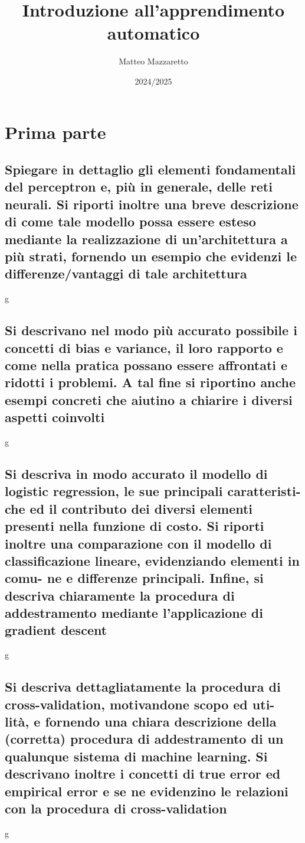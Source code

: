 \documentclass[10pt,oneside,a4paper]{article}
\title{Introduzione all'apprendimento automatico}
\author{Matteo Mazzaretto}
\date{2024/2025}
\begin{document}
\maketitle
\begin{center}
\renewcommand{\contentsname}{Indice}
\tableofcontents
\end{center}
\newpage
\setcounter{page}{1}
\section{Prima parte}
\subsection{Spiegare in dettaglio gli elementi fondamentali del perceptron e, più in generale, delle reti
	neurali. Si riporti inoltre una breve descrizione di come tale modello possa essere esteso
	mediante la realizzazione di un’architettura a più strati, fornendo un esempio che evidenzi
	le differenze/vantaggi di tale architettura}
g
\subsection{Si descrivano nel modo più accurato possibile i concetti di bias e variance, il loro rapporto e come nella pratica possano essere affrontati e ridotti i problemi. A tal fine si riportino anche esempi concreti che aiutino a chiarire i diversi aspetti coinvolti}
g
\subsection{Si descriva in modo accurato il modello di logistic regression, le sue principali caratteristi-
	che ed il contributo dei diversi elementi presenti nella funzione di costo. Si riporti inoltre
	una comparazione con il modello di classificazione lineare, evidenziando elementi in comu-
	ne e differenze principali. Infine, si descriva chiaramente la procedura di addestramento
	mediante l’applicazione di gradient descent}
g
\subsection{Si descriva dettagliatamente la procedura di cross-validation, motivandone scopo ed uti-
	lità, e fornendo una chiara descrizione della (corretta) procedura di addestramento di un
	qualunque sistema di machine learning. Si descrivano inoltre i concetti di true error ed
	empirical error e se ne evidenzino le relazioni con la procedura di cross-validation}
g
\end{document}
